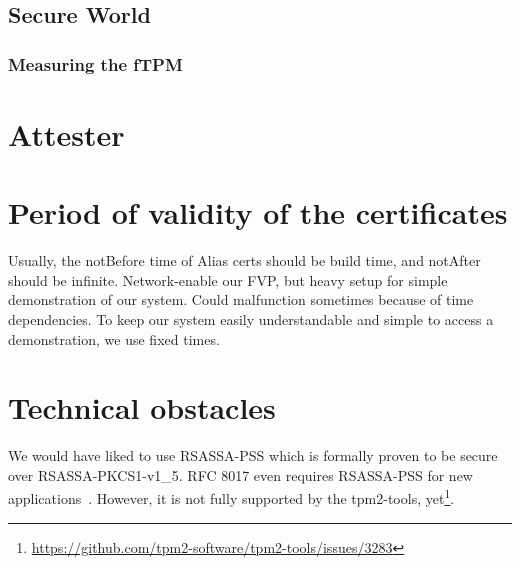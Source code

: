\subsection{Secure World}

\subsubsection{Measuring the fTPM}

\section{Attester}

\section{Period of validity of the certificates}

Usually, the notBefore time of Alias certs should be build time, and notAfter should be infinite.
Network-enable our FVP, but heavy setup for simple demonstration of our system.
Could malfunction sometimes because of time dependencies.
To keep our system easily understandable and simple to access a demonstration, we use fixed times.


\section{Technical obstacles}

We would have liked to use RSASSA-PSS which is formally proven to be secure over RSASSA-PKCS1-v1\_5.
RFC 8017 even requires RSASSA-PSS for new applications~\cite{Moriarty2016}.
However, it is not fully supported by the tpm2-tools, yet\footnote{\url{https://github.com/tpm2-software/tpm2-tools/issues/3283}}.
